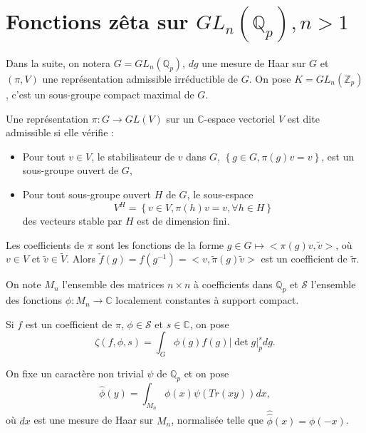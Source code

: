 \section{Fonctions zêta sur $GL_n(\mathbb{Q}_p), n > 1$}

Dans la suite, on notera $G = GL_n(\mathbb{Q}_p)$, $dg$ une mesure de Haar sur $G$ et $(\pi, V)$ une représentation admissible irréductible de $G$. On pose $K=GL_n(\mathbb{Z}_p)$, c'est un sous-groupe compact maximal de $G$.

\begin{definition}
Une représentation $\pi : G \rightarrow GL(V)$ sur un $\mathbb{C}$-espace vectoriel $V$ est dite admissible si elle vérifie :
\begin{itemize}
\item Pour tout $v \in V$, le stabilisateur de $v$ dans $G$, $\left\lbrace g \in G, \pi(g)v = v \right\rbrace$, est un sous-groupe ouvert de $G$,
\item Pour tout sous-groupe ouvert $H$ de $G$, le sous-espace
\begin{equation*}
V^H=\left\lbrace v \in V, \pi(h)v = v, \forall h \in H \right\rbrace
\end{equation*}
des vecteurs stable par $H$ est de dimension fini.
\end{itemize}
\end{definition}

Les coefficients de $\pi$ sont les fonctions de la forme $g \in G \mapsto <\pi(g)v, \tilde{v}>$, où $v \in V$ et $\tilde{v} \in \tilde{V}$. Alors $\check{f}(g)=f(g^{-1})=<v, \tilde{\pi}(g)\tilde{v}>$ est un coefficient de $\tilde{\pi}$.

On note $M_n$ l'ensemble des matrices $n \times n$ à coefficients dans $\mathbb{Q}_p$ et $\mathcal{S}$ l'ensemble des fonctions $\phi : M_n \rightarrow \mathbb{C}$ localement constantes à support compact.

Si $f$ est un coefficient de $\pi$, $\phi \in \mathcal{S}$ et $s \in \mathbb{C}$, on pose
\begin{equation}
\zeta(f, \phi, s) = \int_G \phi(g)f(g)|\det g|_p^s dg.
\end{equation}

On fixe un caractère non trivial $\psi$ de $\mathbb{Q}_p$ et on pose
\begin{equation}
\hat{\phi}(y) = \int_{M_n} \phi(x) \psi(Tr(xy)) dx,
\end{equation}
où $dx$ est une mesure de Haar sur $M_n$, normalisée telle que $\hat{\hat{\phi}}(x)=\phi(-x)$.

